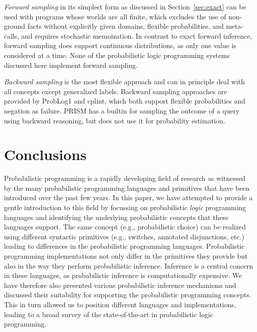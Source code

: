 \documentclass[a4paper]{article}
\begin{document}
\emph{Forward sampling} in its simplest form as discussed in Section~\ref{sec:exact} can be used with programs whose worlds are all
finite, which excludes the use of non-ground facts without explicitly given domains, flexible
probabilities, and meta-calls, and requires stochastic memoization. In
contrast to exact forward inference, forward sampling does support
continuous distributions, as only one value is considered at a
time. None of the probabilistic logic
programming systems discussed here implement 
forward sampling. 

\emph{Backward sampling} is the most flexible approach and can in principle
deal with all concepts except generalized labels. 
 Backward sampling approaches are
provided by ProbLog1 and cplint, which both support flexible
probabilities and negation as failure. PRISM has a builtin for sampling the
outcome of a query using backward reasoning, but does not use it for
probability estimation. 







\section{Conclusions} \label{sec:conclusions}
Probabilistic programming is a rapidly developing field of research 
as witnessed by the many probabilistic programming languages and primitives that have 
been introduced over the past few years.  In this paper, we have attempted to provide a gentle introduction
to this field by focussing on probabilistic {\em logic} programming languages 
and identifying the underlying probabilistic concepts that these languages support.
The same concept (e.g., probabilistic choice) can be realized 
using different syntactic primitives (e.g., switches, annotated
disjunctions, etc.) leading to differences in the probabilistic programming languages. 
Probabilistic programming implementations
not only differ in the primitives they provide
but also in the way they perform probabilistic inference. 
Inference is a central concern in these languages,
as probabilistic inference is computationally expensive. 
We have therefore also presented various probabilistic inference mechanisms and discussed 
their suitability for supporting the probabilistic programming concepts. 
This in turn allowed us to position different languages and implementations,
leading to a broad survey of the state-of-the-art in probabilistic logic programming.
\end{document}
